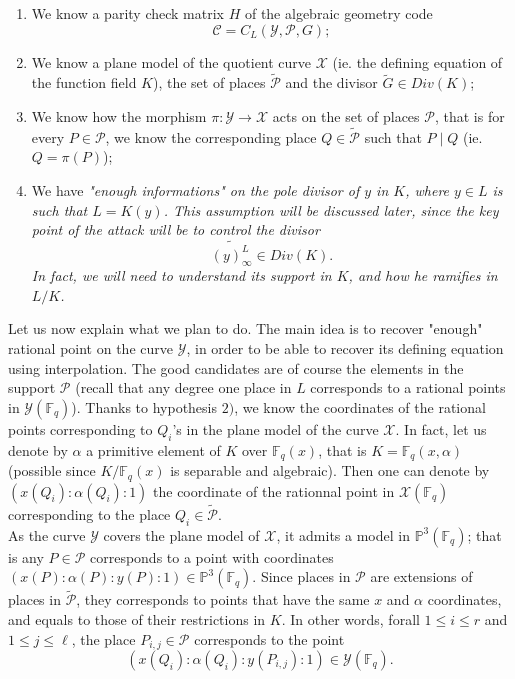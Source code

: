 \documentclass[10pt]{article}
\newcommand{\s}{\vspace{0.3cm}}
\newcommand{\fq}{\mathbb{F}_q}
\newcommand{\X}{\mathcal{X}}
\newcommand{\Y}{\mathcal{Y}}
\newcommand{\PR}{\mathcal{P}}
\begin{document}
\begin{enumerate}
\item We know a parity check matrix $H$ of the algebraic geometry code \[\mathcal{C} = C_L(\Y,\PR,G) ;\]
\item We know a plane model of the quotient curve $\X$ (ie. the defining equation of the function field $K$), the set of places $\tilde{\PR}$ and the divisor $\tilde{G} \in Div(K)$;
\item We know how the morphism $\pi : \Y \rightarrow \X$ acts on the set of places $\PR$, that is for every $P \in \PR$, we know the corresponding place $Q \in \tilde{\PR}$ such that $P \mid Q$ (ie. $Q=\pi(P)$);
\item We have \it{"enough informations"} \rm on the pole divisor of $y$ in $K$, where $y \in L$ is such that $L=K(y)$. This assumption will be discussed later, since the key point of the attack will be to control the divisor 
\[\widetilde{(y)^L_{\infty}} \in Div(K).\] 
In fact, we will need to understand its support in $K$, and how he ramifies in $L/K$.
\end{enumerate}
\s

Let us now explain what we plan to do. The main idea is to recover "enough" rational point on the curve $\Y$, in order to be able to recover its defining equation using interpolation. The good candidates are of course the elements in the support $\PR$ (recall that any degree one place in $L$ corresponds to a rational points in $\Y(\fq)$). Thanks to hypothesis $2)$, we know the coordinates of the rational points corresponding to $Q_i$'s in the plane model of the curve $\X$. In fact, let us denote by $\alpha$ a primitive element of $K$ over $\fq(x)$, that is $K = \fq(x,\alpha)$ (possible since $K/\fq(x)$ is separable and algebraic). Then one can denote by $(x(Q_i):\alpha(Q_i):1)$ the coordinate of the rationnal point in $\X(\fq)$ corresponding to the place $Q_i \in \tilde{\PR}$. \\

As the curve $\Y$ covers the plane model of $\X$, it admits a model in $\mathbb{P}^3(\fq)$; that is any $P \in \PR$ corresponds to a point with coordinates $(x(P):\alpha(P):y(P):1) \in \mathbb{P}^3(\fq)$. Since places in $\PR$ are extensions of places in $\tilde{\PR}$, they corresponds to points that have the same $x$ and $\alpha$ coordinates, and equals to those of their restrictions in $K$. In other words, forall $1 \leq i \leq r$ and $1 \leq j \leq \ell$, the place $P_{i,j} \in \PR$ corresponds to the point
\[ (x(Q_i):\alpha(Q_i):y(P_{i,j}):1) \in \Y(\fq).\]
\end{document}
